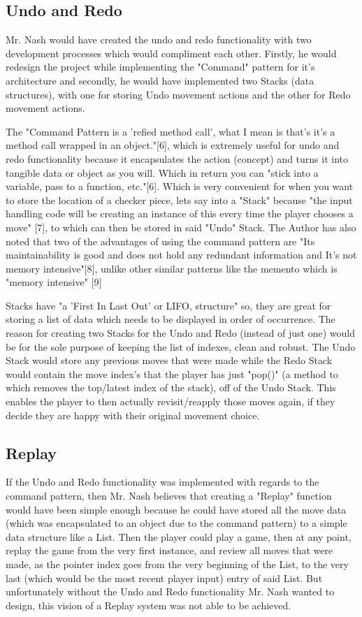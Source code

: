 \documentclass[10pt, a4paper]{article}
\begin{document}
	 \subsection{Undo and Redo}
	 Mr. Nash would have created the undo and redo functionality with two development processes which would compliment each other. Firstly, he would redesign the project while implementing the "Command" pattern for it's architecture and secondly, he would have implemented two Stacks (data structures), with one for storing Undo movement actions and the other for Redo movement actions. 
	 
	 The "Command Pattern is a 'refied method call', what I mean is that's it's a method call wrapped in an object."[6], which is extremely useful for undo and redo functionality because it encapsulates the action (concept) and turns it into tangible data or object as you will. Which in return you can "stick into a variable, pass to a function, etc."[6]. Which is very convenient for when you want to store the location of a checker piece, lets say into a "Stack" because "the input handling code will be creating an instance of this every time the player chooses a move" [7], to which can then be stored in said "Undo" Stack. The Author has also noted that two of the advantages of using the command pattern are "Its maintainability is good and does not hold any redundant information and It's not memory intensive"[8], unlike other similar patterns like the memento which is "memory intensive" [9]
	 
	 Stacks have "a 'First In Last Out' or LIFO, structure" so, they are great for storing a list of data which needs to be displayed in order of occurrence. The reason for creating two Stacks for the Undo and Redo (instead of just one) would be for the sole purpose of keeping the list of indexes, clean and robust. The Undo Stack would store any previous moves that were made while the Redo Stack would contain the move index's that the player has just "pop()" (a method to which removes the top/latest index of the stack), off of the Undo Stack. This enables the player to then actually revisit/reapply those moves again, if they decide they are happy with their original movement choice.
	 
	 \subsection{Replay}
	 If the Undo and Redo functionality was implemented with regards to the command pattern, then Mr. Nash believes that creating a "Replay" function would have been simple enough because he could have stored all the move data (which was encapsulated to an object due to the command pattern) to a simple data structure like a List. Then the player could play a game, then at any point, replay the game from the very first instance, and review all moves that were made, as the pointer index goes from the very beginning of the List, to the very last (which would be the most recent player input) entry of said List. But unfortunately without the Undo and Redo functionality Mr. Nash wanted to design, this vision of a Replay system was not able to be achieved.
	 
\end{document}
